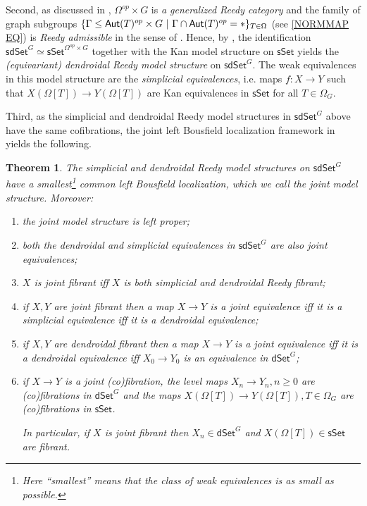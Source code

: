 \documentclass[a4paper,10pt
,draft
]{article}%
\numberwithin{equation}{section}
\numberwithin{figure}{section}
\newtheorem{theorem}[equation]{Theorem}%
\theoremstyle{definition} %
\newcommand{\sSet}{\ensuremath{\mathsf{sSet}}}%
\newcommand{\dSet}{\mathsf{dSet}}
\newcommand{\1}{\ensuremath{\mathbbm 1}}%
\begin{document}
Second, as discussed in 
\cite[Ex. A.7]{BP_edss},
$\Omega^{op} \times G$ is \emph{a generalized Reedy category}
and the family of graph subgroups 
$\{\Gamma \leq \mathsf{Aut}(T)^{op} \times G
\ | \ \Gamma \cap \mathsf{Aut}(T)^{op} = \**\}_{T\in \Omega}$
(see \eqref{NORMMAP EQ}) is
\emph{Reedy admissible}
in the sense of \cite[Ex. A.2]{BP_edss}.
Hence, by \cite[Thm. A.8]{BP_edss},
the identification 
$\mathsf{sdSet}^G \simeq 
\mathsf{sSet}^{\Omega^{op} \times G}$
together with the Kan model structure on 
$\mathsf{sSet}$
yields the 
\textit{(equivariant) dendroidal Reedy model structure} on $\mathsf{sdSet}^G$.
The weak equivalences in this model structure are the
\emph{simplicial equivalences},
i.e. maps $f \colon X \to Y$
such that 
$X(\Omega[T]) \to Y(\Omega[T])$
are Kan equivalences in $\mathsf{sSet}$
for all $T \in \Omega_G$.

Third, as the simplicial and dendroidal Reedy model structures
in $\mathsf{sdSet}^G$ above have the same cofibrations,
the joint left Bousfield localization framework in 
\cite[\S 4.1]{BP_edss}
yields the following.


\begin{theorem}\label{JB_THM}
	The simplicial and dendroidal Reedy model structures on 
	$\mathsf{sdSet}^G$
	have a smallest\footnote{Here ``smallest'' means that the class of weak equivalences is as small as possible.}
	common left Bousfield localization,
	which we call the \emph{joint model structure}.
	Moreover:
\begin{enumerate}[label = (\roman*)]
	\item \label{PROPER_LBL}
	the joint model structure is left proper;
	\item \label{SDEQUIV_LBL}
	both the dendroidal and simplicial equivalences in $\mathsf{sdSet}^G$ are also joint equivalences;
	\item \label{JTFIB_LBL}
	$X$ is joint fibrant iff $X$ is both simplicial and dendroidal Reedy fibrant;
	\item \label{SFIB_JEQ_LBL} if $X,Y$ are joint fibrant
	then a map $X \to Y$ is a joint equivalence iff it is a simplicial
	equivalence iff it is a dendroidal equivalence;
	\item \label{DFIB_JEQ_LBL} if $X,Y$ are dendroidal fibrant
	then a map $X \to Y$ is a joint equivalence iff 
	it is a dendroidal equivalence iff $X_0 \to Y_0$ is an equivalence in $\mathsf{dSet}^G$;
	\item \label{JTCFIB_MAP_LBL} 
	if $X \to Y$ is a joint (co)fibration,
	the level maps 
	$X_n \to Y_n, n \geq 0$
	are (co)fibrations in $\mathsf{dSet}^G$
	and the maps
	$X\left(\Omega[T]\right) \to Y\left(\Omega[T]\right), T \in \Omega_G$
	are (co)fibrations in $\mathsf{sSet}$.

	In particular, if 
	$X$ is joint fibrant
	then $X_n \in \dSet^G$ and $X(\Omega[T]) \in \sSet$ are fibrant.
\end{enumerate}
\end{theorem}
\end{document}
